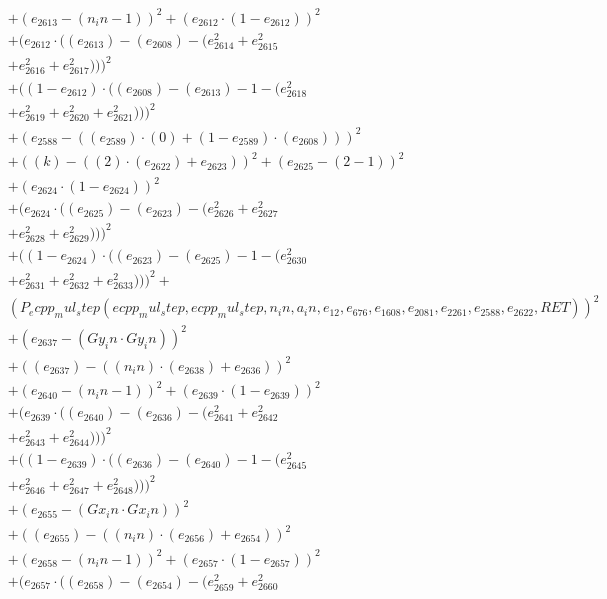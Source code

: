 \documentclass[10pt, a4paper]{article}
\begin{document}
\begin{small}
\begin{align*}
& + (e_{2613} - (n_in - 1))^{2} + (e_{2612}  \cdot  (1 - e_{2612}))^{2} \\
& + (e_{2612}  \cdot  ((e_{2613}) - (e_{2608}) - (e_{2614}^{2} + e_{2615}^{2} \\
& + e_{2616}^{2} + e_{2617}^{2})))^{2} \\
& + ((1 - e_{2612})  \cdot  ((e_{2608}) - (e_{2613}) - 1 - (e_{2618}^{2} \\
& + e_{2619}^{2} + e_{2620}^{2} + e_{2621}^{2})))^{2} \\
& + (e_{2588} - ((e_{2589})  \cdot  (0) + (1 - e_{2589})  \cdot  (e_{2608})))^{2} \\
& + ((k) - ((2)  \cdot  (e_{2622}) + e_{2623}))^{2} + (e_{2625} - (2 - 1))^{2} \\
& + (e_{2624}  \cdot  (1 - e_{2624}))^{2} \\
& + (e_{2624}  \cdot  ((e_{2625}) - (e_{2623}) - (e_{2626}^{2} + e_{2627}^{2} \\
& + e_{2628}^{2} + e_{2629}^{2})))^{2} \\
& + ((1 - e_{2624})  \cdot  ((e_{2623}) - (e_{2625}) - 1 - (e_{2630}^{2} \\
& + e_{2631}^{2} + e_{2632}^{2} + e_{2633}^{2})))^{2} + \\
& (P_ecpp_mul_step(ecpp_mul_step, ecpp_mul_step, n_in, a_in, e_{12}, e_{676}, e_{1608}, e_{2081}, e_{2261}, e_{2588}, e_{2622}, RET))^{2} \\
& + (e_{2637} - (Gy_in  \cdot  Gy_in))^{2} \\
& + ((e_{2637}) - ((n_in)  \cdot  (e_{2638}) + e_{2636}))^{2} \\
& + (e_{2640} - (n_in - 1))^{2} + (e_{2639}  \cdot  (1 - e_{2639}))^{2} \\
& + (e_{2639}  \cdot  ((e_{2640}) - (e_{2636}) - (e_{2641}^{2} + e_{2642}^{2} \\
& + e_{2643}^{2} + e_{2644}^{2})))^{2} \\
& + ((1 - e_{2639})  \cdot  ((e_{2636}) - (e_{2640}) - 1 - (e_{2645}^{2} \\
& + e_{2646}^{2} + e_{2647}^{2} + e_{2648}^{2})))^{2} \\
& + (e_{2655} - (Gx_in  \cdot  Gx_in))^{2} \\
& + ((e_{2655}) - ((n_in)  \cdot  (e_{2656}) + e_{2654}))^{2} \\
& + (e_{2658} - (n_in - 1))^{2} + (e_{2657}  \cdot  (1 - e_{2657}))^{2} \\
& + (e_{2657}  \cdot  ((e_{2658}) - (e_{2654}) - (e_{2659}^{2} + e_{2660}^{2} \\

\end{align*}
\end{small}
\end{document}
